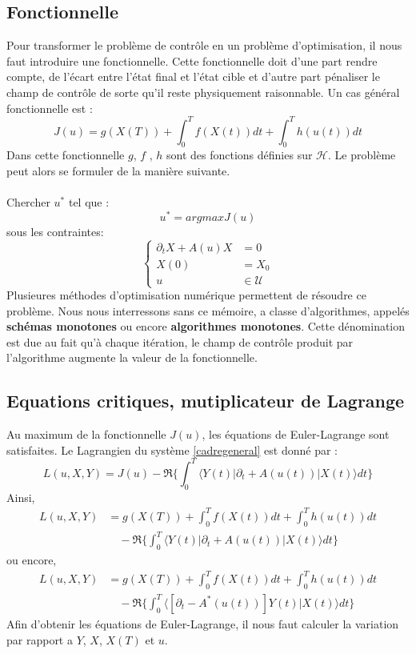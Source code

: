 \subsection{Fonctionnelle}
Pour transformer le problème de contrôle en un problème d’optimisation, il nous faut introduire une fonctionnelle. Cette fonctionnelle doit d’une part rendre compte, de l’écart entre l'état final et l'état cible et d’autre part pénaliser le champ de contrôle de sorte qu’il reste physiquement raisonnable. Un cas général fonctionnelle est :
\begin{equation}
J(u)=g(X(T))+\int_{0}^{T} f(X(t))dt+\int_{0}^{T} h(u(t))dt
\end{equation}
Dans cette fonctionnelle $g$, $f$ , $h$ sont des fonctions définies sur $\mathcal{H}$. Le problème peut alors se formuler de la manière suivante.\\\\
Chercher $u^*$ tel que :
\begin{equation*}
u^*=argmaxJ(u)
\end{equation*}
sous les contraintes:
\begin{equation*}
\begin{cases}
\partial_{t}X +A(u)X &= 0\\
X(0) &=X_0\\
u &\in \mathcal{U}
\end{cases}
\end{equation*}
Plusieures méthodes d'optimisation numérique permettent de résoudre ce problème. Nous nous interressons sans ce mémoire, a classe d’algorithmes, appelés \textbf{schémas monotones} ou encore \textbf{algorithmes monotones}. Cette dénomination est due au fait qu’à chaque itération, le champ de contrôle produit par l’algorithme augmente la valeur de la fonctionnelle.
\subsection{Equations critiques, mutiplicateur de Lagrange}
Au maximum de la fonctionnelle $J(u)$, les équations de Euler-Lagrange sont satisfaites. Le Lagrangien du système \eqref{cadregeneral} est donné par :
\begin{equation}
L(u,X,Y)= J(u) -\Re \bigg\{ \int_{0}^{T}\langle Y (t)|\partial_{t}+A(u(t))|X(t) \rangle dt \bigg\}
\end{equation}
Ainsi,
\begin{align*}
L(u,X,Y)&= g(X(T))+\int_{0}^{T} f(X(t))dt+\int_{0}^{T} h(u(t))dt\\
&\quad -\Re \bigg\{ \int_{0}^{T}\langle Y (t)|\partial_{t}+A(u(t))|X(t) \rangle dt \bigg\}
\end{align*}
ou encore,
\begin{align*}
L(u,X,Y)&= g(X(T))+\int_{0}^{T} f(X(t))dt+\int_{0}^{T} h(u(t))dt\\
&\quad -\Re \bigg\{ \int_{0}^{T}\langle [\partial_{t}-A^*(u(t))]Y (t)|X(t) \rangle dt \bigg\}
\end{align*}
Afin d'obtenir les équations de Euler-Lagrange, il nous faut calculer la variation par rapport a $Y$, $X$, $X(T)$ et $u$.
